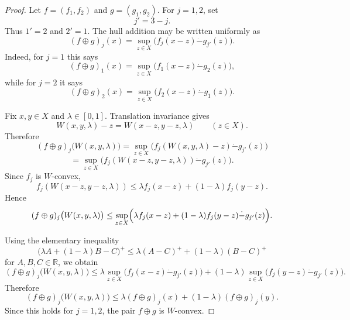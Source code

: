 \documentclass[10pt,a4paper]{amsart}
\begin{document}
\begin{proof}
Let \(f=(f_1,f_2)\) and \(g=(g_1,g_2)\).  For \(j=1,2\), set
\[
j' = 3-j.
\]
Thus \(1'=2\) and \(2'=1\).  The hull addition may be written uniformly as
\[
(f\oplus g)_j(x)
=
\sup_{z\in X}
\bigl(f_j(x-z)\dot{-}g_{j'}(z)\bigr).
\]
Indeed, for \(j=1\) this says
\[
(f\oplus g)_1(x)
=
\sup_{z\in X}
\bigl(f_1(x-z)\dot{-}g_2(z)\bigr),
\]
while for \(j=2\) it says
\[
(f\oplus g)_2(x)
=
\sup_{z\in X}
\bigl(f_2(x-z)\dot{-}g_1(z)\bigr).
\]

Fix \(x,y\in X\) and \(\lambda\in[0,1]\).  Translation invariance gives
\[
W(x,y,\lambda)-z
=
W(x-z,y-z,\lambda)
\qquad (z\in X).
\]
Therefore
\[
(f\oplus g)_j\bigl(W(x,y,\lambda)\bigr)
=
\sup_{z\in X}
\bigl(
f_j(W(x,y,\lambda)-z)\dot{-}g_{j'}(z)
\bigr)
\]
\[
=
\sup_{z\in X}
\bigl(
f_j(W(x-z,y-z,\lambda))\dot{-}g_{j'}(z)
\bigr).
\]
Since \(f_j\) is \(W\)-convex,
\[
f_j(W(x-z,y-z,\lambda))
\le
\lambda f_j(x-z)+(1-\lambda)f_j(y-z).
\]
Hence
\[
(f\oplus g)_j\bigl(W(x,y,\lambda)\bigr)
\le
\sup_{z\in X}
\Bigl(
\lambda f_j(x-z)+(1-\lambda)f_j(y-z)\dot{-}g_{j'}(z)
\Bigr).
\]

Using the elementary inequality
\[
\bigl(\lambda A+(1-\lambda)B-C\bigr)^+
\le
\lambda(A-C)^+ + (1-\lambda)(B-C)^+
\]
for \(A,B,C\in\mathbb R\), we obtain
\[
(f\oplus g)_j\bigl(W(x,y,\lambda)\bigr)
\le
\lambda
\sup_{z\in X}\bigl(f_j(x-z)\dot{-}g_{j'}(z)\bigr)
+
(1-\lambda)
\sup_{z\in X}\bigl(f_j(y-z)\dot{-}g_{j'}(z)\bigr).
\]
Therefore
\[
(f\oplus g)_j\bigl(W(x,y,\lambda)\bigr)
\le
\lambda (f\oplus g)_j(x)+(1-\lambda)(f\oplus g)_j(y).
\]
Since this holds for \(j=1,2\), the pair \(f\oplus g\) is \(W\)-convex.
\end{proof}
\end{document}
